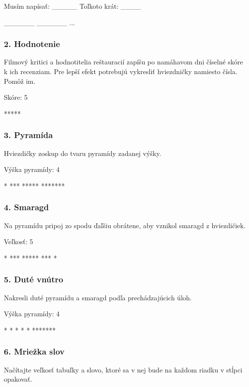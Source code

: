\begin{code}
Musím napísať: _____
Toľkoto krát: ____

______
______
...
\end{code}


\subsubsection*{2. Hodnotenie}
Filmový kritici a hodnotitelia reštauracií zapíšu po namáhavom dni číselné skóre k ich recenziam. Pre lepší efekt potrebujú vykresliť hviezdničky namiesto čísla. Pomôž im.

\begin{code}
Skóre: 5

*****
\end{code}

\subsubsection*{3. Pyramída}
Hviezdičky zoskup do tvaru pyramídy zadanej výšky.

\begin{code}
Výška pyramídy: 4

   *
  ***
 *****
*******
\end{code}

\subsubsection*{4. Smaragd}
Na pyramídu pripoj zo spodu ďaľšiu obrátene, aby vznikol smaragd z hviezdičiek.

\begin{code}
Veľkosť: 5

  *
 ***
*****
 ***
  *
\end{code}

\subsubsection*{5. Duté vnútro}
Nakresli duté pyramídu a smaragd podľa prechádzajúcich úloh.

\begin{code}
Výška pyramídy: 4

    *
   * *
  *   *
 *******
\end{code}


\subsubsection*{6. Mriežka slov}
Načítajte veľkosť tabuľky a slovo, ktoré sa v nej bude na každom riadku v stĺpci opakovať.

